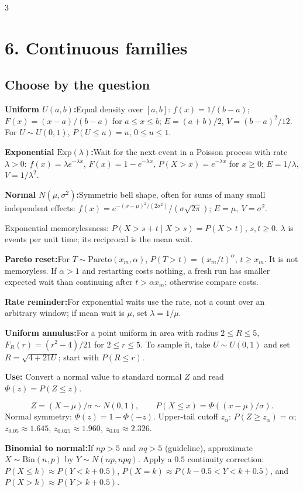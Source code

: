 \documentclass[10pt,a4paper,landscape]{article}
\newcommand{\CheatNote}[2]{\par\noindent\textcolor{cueorange}{\textbf{#1:}}\;#2\par}
\newenvironment{QuickPointers}[1][Quick pointers]{\subsection*{#1}\begingroup\setlength{\parskip}{0pt}}{\endgroup}
\newcommand{\Pointer}[2]{\par\noindent\textbf{#1:}\;#2\par}
\newcommand{\Use}[1]{\textcolor{cueorange}{\textbf{Use:}} #1\par}
\begin{document}
\begin{multicols}{3}
\section*{6. Continuous families}
\begin{QuickPointers}[Choose by the question]
\Pointer{Uniform \(U(a,b)\)}{Equal density over \([a,b]\): \(f(x)=1/(b-a)\); \(F(x)=(x-a)/(b-a)\) for \(a\le x\le b\); \(E=(a+b)/2\), \(V=(b-a)^2/12\). For \(U\sim U(0,1)\), \(P(U\le u)=u\), \(0\le u\le1\).}
\Pointer{Exponential \(\mathrm{Exp}(\lambda)\)}{Wait for the next event in a Poisson process with rate \(\lambda>0\): \(f(x)=\lambda e^{-\lambda x}\), \(F(x)=1-e^{-\lambda x}\), \(P(X>x)=e^{-\lambda x}\) for \(x\ge0\); \(E=1/\lambda\), \(V=1/\lambda^2\).}
\Pointer{Normal \(N(\mu,\sigma^2)\)}{Symmetric bell shape, often for sums of many small independent effects: \(f(x)=e^{-(x-\mu)^2/(2\sigma^2)}/(\sigma\sqrt{2\pi})\); \(E=\mu,\ V=\sigma^2\).}
\end{QuickPointers}
Exponential memorylessness: \(P(X>s+t\mid X>s)=P(X>t)\), \(s,t\ge0\). \(\lambda\) is events per unit time; its reciprocal is the mean wait.
\CheatNote{Pareto reset}{For \(T\sim\mathrm{Pareto}(x_m,\alpha)\), \(P(T>t)=(x_m/t)^\alpha\), \(t\ge x_m\). It is not memoryless. If \(\alpha>1\) and restarting costs nothing, a fresh run has smaller expected wait than continuing after \(t>\alpha x_m\); otherwise compare costs.}\CheatNote{Rate reminder}{For exponential waits use the rate, not a count over an arbitrary window; if mean wait is \(\mu\), set \(\lambda=1/\mu\).}
\CheatNote{Uniform annulus}{For a point uniform in area with radius \(2\le R\le5\), \(F_R(r)=(r^2-4)/21\) for \(2\le r\le5\). To sample it, take \(U\sim U(0,1)\) and set \(R=\sqrt{4+21U}\); start with \(P(R\le r)\).}
\Use{Convert a normal value to standard normal \(Z\) and read \(\Phi(z)=P(Z\le z)\).}
\[Z=(X-\mu)/\sigma\sim N(0,1),\qquad P(X\le x)=\Phi((x-\mu)/\sigma).\]
Normal symmetry: \(\Phi(z)=1-\Phi(-z)\). Upper-tail cutoff \(z_\alpha\): \(P(Z\ge z_\alpha)=\alpha\); \(z_{0.05}\approx1.645\), \(z_{0.025}\approx1.960\), \(z_{0.01}\approx2.326\).
\CheatNote{Binomial to normal}{If \(np>5\) and \(nq>5\) (guideline), approximate \(X\sim\mathrm{Bin}(n,p)\) by \(Y\sim N(np,npq)\). Apply a \(0.5\) continuity correction: \(P(X\le k)\approx P(Y<k+0.5)\), \(P(X=k)\approx P(k-0.5<Y<k+0.5)\), and \(P(X>k)\approx P(Y>k+0.5)\).}

\end{multicols}
\end{document}
